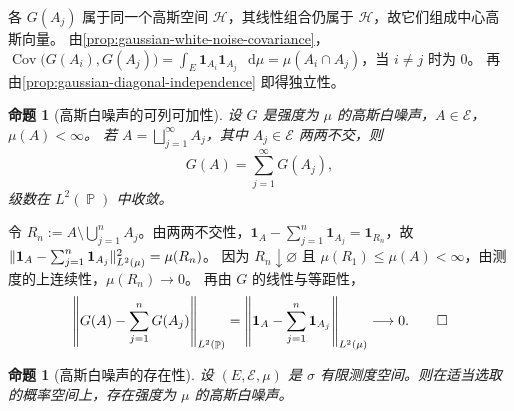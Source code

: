 \documentclass[UTF8,11pt,a4paper,oneside,fontset=fandol]{ctexrep}
\makeatletter
\numberwithin{equation}{section}
\theoremstyle{zhthm}
\newtheorem{proposition}[theorem]{命题}
\renewenvironment{proof}[1][\proofname]{\par
  \pushQED{\qed}%
  \normalfont\topsep6\p@\@plus6\p@\relax
  \trivlist
  \item[\hskip\labelsep\bfseries#1\hspace{0.5em}]\ignorespaces
}{%
  \popQED\endtrivlist\@endpefalse
}
\renewcommand{\proofname}{证明}
\newcommand{\Hcal}{\mathcal{H}}
\DeclareMathOperator{\Prob}{\mathbb{P}}
\DeclareMathOperator{\Cov}{Cov}
\newcommand{\ind}[1]{\mathbf{1}_{#1}}
\newcommand{\dd}{\mathop{}\!\mathrm{d}}
\DeclarePairedDelimiter{\norm}{\lVert}{\rVert}
\makeatother
\begin{document}
\begin{proof}
各 $G(A_j)$ 属于同一个高斯空间 $\Hcal$，其线性组合仍属于 $\Hcal$，故它们组成中心高斯向量。
由\cref{prop:gaussian-white-noise-covariance}，
$\Cov\bigl(G(A_i),G(A_j)\bigr)=\int_E\ind{A_i}\ind{A_j}\,\dd\mu=\mu(A_i\cap A_j)$，当 $i\ne j$ 时为 $0$。
再由\cref{prop:gaussian-diagonal-independence} 即得独立性。
\end{proof}

\begin{proposition}[高斯白噪声的可列可加性]
\label{prop:gaussian-white-noise-countable-additivity}
设 $G$ 是强度为 $\mu$ 的高斯白噪声，$A\in\mathcal{E}$，$\mu(A)<\infty$。
若 $A=\bigsqcup_{j=1}^{\infty}A_j$，其中 $A_j\in\mathcal{E}$ 两两不交，则
\[
  G(A)=\sum_{j=1}^{\infty}G(A_j),
\]
级数在 $L^2(\Prob)$ 中收敛。
\end{proposition}

\begin{proof}
令 $R_n:=A\setminus\bigcup_{j=1}^{n}A_j$。由两两不交性，$\ind{A}-\sum_{j=1}^{n}\ind{A_j}=\ind{R_n}$，故
$\norm{\ind{A}-\sum_{j=1}^{n}\ind{A_j}}_{L^2(\mu)}^2=\mu(R_n)$。
因为 $R_n\downarrow\varnothing$ 且 $\mu(R_1)\le\mu(A)<\infty$，由测度的上连续性，$\mu(R_n)\to0$。
再由 $G$ 的线性与等距性，
\[
  \norm*{G(A)-\sum_{j=1}^{n}G(A_j)}_{L^2(\Prob)}
  =\norm*{\ind{A}-\sum_{j=1}^{n}\ind{A_j}}_{L^2(\mu)}\longrightarrow0.\qedhere
\]
\end{proof}

\begin{proposition}[高斯白噪声的存在性]
\label{prop:gaussian-white-noise-existence}
设 $(E,\mathcal{E},\mu)$ 是 $\sigma$ 有限测度空间。则在适当选取的概率空间上，存在强度为 $\mu$ 的高斯白噪声。
\end{proposition}
\end{document}

